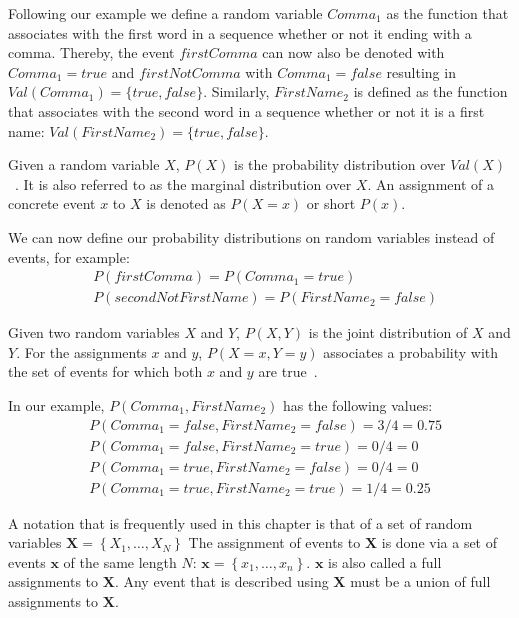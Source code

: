 Following our example we define a \gls{random variable} $Comma_1$ as the \gls{function} that associates with the first word in a sequence whether or not it ending with a comma.
Thereby, the \gls{event} $firstComma$ can now also be denoted with $Comma_1{=}true$ and $firstNotComma$ with $Comma_1{=}false$ resulting in $Val(Comma_1)=\{true, false\}$.
Similarly, $FirstName_2$ is defined as the function that associates with the second word in a sequence whether or not it is a first name: $Val(FirstName_2)=\{true, false\}$.

\bigskip

Given a \gls{random variable} $X$, $P(X)$ is the \gls{probability distribution} over $Val(X)$~\cite{koller2009probabilistic}.
It is also referred to as the \gls{marginal distribution} over $X$.
An assignment of a concrete event $x$ to $X$ is denoted as $P(X=x)$ or short $P(x)$.

We can now define our \glspl{probability distribution} on \glspl{random variable} instead of \glspl{event}, for example:
\begin{equation*}
  \begin{split}
    &P(firstComma)= P(Comma_1{=}true)\\
    &P(secondNotFirstName)= P(FirstName_2{=}false)
  \end{split}
\end{equation*}

\bigskip

Given two \glspl{random variable} $X$ and $Y$, $P(X,Y)$ is the \gls{joint distribution} of $X$ and $Y$.
For the assignments $x$ and $y$, $P(X{=}x,Y{=}y)$ associates a probability with the set of \glspl{event} for which both $x$ and $y$ are true~\cite{koller2009probabilistic}.

In our example, $P(Comma_1,FirstName_2)$ has the following values:
\begin{equation*}
  \begin{split}
    &P(Comma_1{=}false,FirstName_2{=}false)=3/4=0.75\\
    &P(Comma_1{=}false,FirstName_2{=}true)=0/4=0\\
    &P(Comma_1{=}true,FirstName_2{=}false)=0/4=0\\
    &P(Comma_1{=}true,FirstName_2{=}true)=1/4=0.25
  \end{split}
\end{equation*}

\bigskip

A notation that is frequently used in this chapter is that of a set of \glspl{random variable} $\mathbf{X}=\left\{ X_1,\dots,X_N\right\}$
The assignment of \glspl{event} to $\mathbf{X}$ is done via a set of events $\mathbf{x}$ of the same length $N$: $\mathbf{x}=\left\{ x_1,\dots,x_n\right\}$.
$\mathbf{x}$ is also called a \glspl{full assignment} to $\mathbf{X}$.
Any \gls{event} that is described using $\mathbf{X}$ must be a union of \glspl{full assignment} to $\mathbf{X}$.

